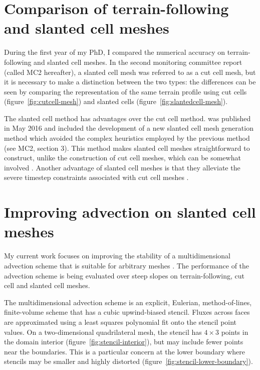 \documentclass[a4paper,11pt]{article}
\begin{document}
\section{Comparison of terrain-following and slanted cell meshes}
\label{sec:tf-slanted-cells}

During the first year of my PhD, I compared the numerical accuracy on terrain-following and slanted cell meshes.
In the second monitoring committee report (called MC2 hereafter), a slanted cell mesh was referred to as a cut cell mesh, but it is necessary to make a distinction between the two types: the differences can be seen by comparing the representation of the same terrain profile using cut cells (figure~\ref{fig:cutcell-mesh}) and slanted cells (figure~\ref{fig:slantedcell-mesh}).

The slanted cell method has advantages over the cut cell method.
\citet{shaw-weller2016} was published in May 2016 and included the development of a new slanted cell mesh generation method which avoided the complex heuristics employed by the previous method (see MC2, section 3).
This method makes slanted cell meshes straightforward to construct, unlike the construction of cut cell meshes, which can be somewhat involved \citep{hartkopf2011}.  Another advantage of slanted cell meshes is that they alleviate the severe timestep constraints associated with cut cell meshes \citep{shaw-weller2016}.

\section{Improving advection on slanted cell meshes}
\label{sec:advection}

My current work focuses on improving the stability of a multidimensional advection scheme that is suitable for arbitrary meshes \citep{weller-shahrokhi2014}.  The performance of the advection scheme is being evaluated over steep slopes on terrain-following, cut cell and slanted cell meshes.

The multidimensional advection scheme is an explicit, Eulerian, method-of-lines, finite-volume scheme that has a cubic upwind-biased stencil.  Fluxes across faces are approximated using a least squares polynomial fit onto the stencil point values.
On a two-dimensional quadrilateral mesh, the stencil has $4 \times 3$ points in the domain interior (figure~\ref{fig:stencil-interior}), but may include fewer points near the boundaries.  This is a particular concern at the lower boundary where stencils may be smaller and highly distorted (figure~\ref{fig:stencil-lower-boundary}).
\end{document}
